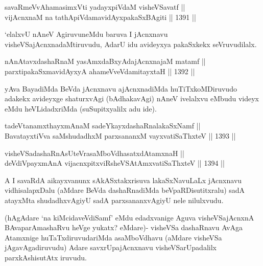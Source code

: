 
\begin{shl}
savaRmeVvAhamasimxVti yadayxpiVdaM visheVSavatf || \\
vijAcnxnaM na tathA\s piVdamavidAyxpakaSxBAgiti \hfill || 1391 ||  
\end{shl}

\begin{artha}
`elalxvU nAneV AgiruvuneMdu baruva I jAcnxnavu visheVSajAcnxnadaMtiruvudu, AdarU idu avideyxya pakaSxkekx seVruvudilalx.
\end{artha}


\begin{shl}
nAnAtavxdashaRnaM yasAmxdaBxyAdajAcnxnajaM matamf || \\
parxtipakaSxmavidAyxyA ahameVveVdamitayxtaH \hfill || 1392 ||  
\end{shl}

\begin{artha}
yAva BayadiMda BeVda jAcnxnavu ajAcnxnadiMda huTiTxkoMDiruvudo adakekx avideyxge shaturxvAgi (bAdhakavAgi) nAneV ivelalxvu eMbudu videyx eMdu heVLidadxriMda (suSupitxyalilx adu ide).
\end{artha}

\begin{shl}
tadeVtanamxthayxmAnaM sadeYkayxdashaRnalakaSxNamf || \\
BavatayxtiVva saMshudadhxM parxsananxM vayxvatiSaThxteV \hfill || 1393 ||  
\end{shl}
				
\begin{shl}
visheVSadashaRnAsUteVrasaMboVdhasatxdA\s \s tamxnaH || \\
deVdiVpayxmAnA vijacnxpitxviRsheVSAtAmx\s vatiSaThxteV \hfill || 1394 ||  
\end{shl}

\begin{artha}
A I savaRdA aikayxvanunx sAkASxtakxrisuva lakaSxNavuLaLx jAcnxnavu vidhisalapxDalu (aMdare BeVda dashaRnadiMda beVpaRDisutitxralu) sadA atayxMta shudadhxvAgiyU sadA parxsananxvAgiyU nele nilulxvudu.
\end{artha}

\begin{artha}
(hAgAdare `na kiMcidaveVdiSamf' eMdu edadxvanige Aguva visheVSajAcnxnA BAvaparAmashaRvu heVge yukatx? eMdare)- visheVSa dashaRnavu AvAga Atamxnige huTaTxdiruvudariMda asaMboVdhavu (aMdare visheVSa jAgavAgadiruvudu) Adare savxrUpajAcnxnavu visheVSarUpadalilx parxkAshisutAtx iruvudu.
\end{artha}

